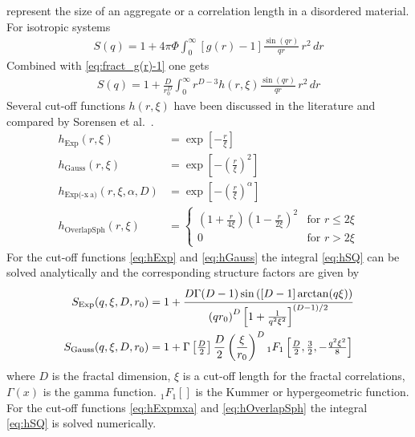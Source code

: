 represent the size of an aggregate or a correlation
length in a disordered material.
For isotropic systems
\begin{align}
S(q) = 1+4\pi\Phi\int_0^\infty [g(r)-1] \frac{\sin(qr)}{qr} \, r^2 \, dr
\end{align}
Combined with \ref{eq:fract_g(r)-1} one gets
\begin{align}
S(q) = 1 +\frac{D}{r_0^D} \int_0^\infty r^{D-3} h(r,\xi)  \frac{\sin(qr)}{qr}\, r^2 \, dr
\label{eq:hSQ}
\end{align}
Several cut-off functions $h(r,\xi)$ have been discussed in the
literature and compared by Sorensen et al.\
\cite{Sorensen1999,Sorensen1992}.
\begin{align}
h_\text{Exp}(r,\xi)     &= \exp\left[-\tfrac{r}{\xi}\right] \label{eq:hExp}\\
h_\text{Gauss}(r,\xi)   &= \exp\left[-\left(\tfrac{r}{\xi}\right)^2\right] \label{eq:hGauss}\\
h_\text{Exp(-x$\hat{~}$a)}(r,\xi,\alpha,D) &= \exp\left[-\left(\tfrac{r}{\xi}\right)^\alpha\right] \label{eq:hExpmxa}\\
h_\text{OverlapSph}(r,\xi)   &=
\begin{cases}
\left(1+\frac{r}{4\xi}\right)\left(1-\frac{r}{2\xi}\right)^2
& \text{for } r\leq 2\xi \\
0 & \text{for } r>2\xi
\end{cases}
\label{eq:hOverlapSph}
\end{align}
For the cut-off functions \ref{eq:hExp} and \ref{eq:hGauss} the integral \ref{eq:hSQ} can be solved
analytically and the corresponding structure factors are given by
\begin{align}
S_\text{Exp}(q,\xi,D,r_0) &= 1 +  \cfrac{D \Gamma(D-1)
\sin\left([D-1]\arctan(q \xi)\right)}{\left( q r_0\right)^D
\left[1+\tfrac{1}{q^2\xi^2}\right]^{(D-1)/2}} \\
S_\text{Gauss}(q,\xi,D,r_0) &= 1 +
    \Gamma\left[\tfrac{D}{2}\right]\frac{D}{2}
    \left(\frac{\xi}{r_0}\right)^D
    {}_1F_1\left[\tfrac{D}{2},\tfrac{3}{2},-\tfrac{q^2\xi^2}{8}\right]
\end{align}
where $D$ is the fractal dimension, $\xi$ is a cut-off length for
the fractal correlations, $\Gamma(x)$ is the gamma function.
${}_1F_1\left[\right]$ is the Kummer or hypergeometric function. For
the cut-off functions \ref{eq:hExpmxa} and \ref{eq:hOverlapSph} the
integral \ref{eq:hSQ} is solved numerically.


